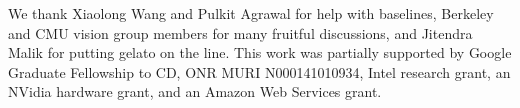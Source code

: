 \documentclass[10pt,twocolumn,letterpaper]{article}
\begin{document}
\footnotesize {} We thank Xiaolong Wang and Pulkit Agrawal for help with baselines,
Berkeley and CMU vision group members for many fruitful discussions, and Jitendra Malik for putting gelato on the line. This work was partially supported by Google Graduate Fellowship to CD, ONR MURI N000141010934, Intel research grant, an NVidia hardware grant, and an Amazon Web Services grant.





{\footnotesize


}
\end{document}
